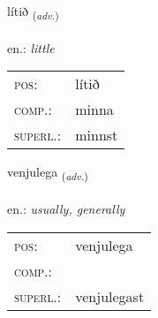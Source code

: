 \documentclass[frontgrid, backgrid]{flacards}\usepackage[]{graphicx}\usepackage[]{xcolor}
\begin{document}
\renewcommand{\flhead}{\vskip5pt \fboxsep=0pt {\small\bfseries\footnotesize Atviksorð | Adverb}}
\renewcommand{\fcfoot}{\vskip5pt \fboxsep=0pt \hspace{2pt}{\small\bfseries\footnotesize 2K}}

\renewcommand{\blhead}{\vskip5pt {\small\bfseries\footnotesize Atviksorð | Adverb }}
\renewcommand{\bcfoot}{\vskip5pt \hspace{2pt}{\small\bfseries\footnotesize 2K}}


{lítið \small{\textsubscript{(\textit{adv.})}} \\[1ex] %
\textphonetic{[liːtɪð]} \\
en.: \emph{little} \\  [2ex]
\renewcommand*{\arraystretch}{0.8}
\begin{tabular}{ll}
\textsc{pos}: & lítið \\ 
\textsc{comp.}: & minna \\ 
\textsc{superl.}: & minnst \\
\end{tabular}
}

\renewcommand{\flhead}{\vskip5pt \fboxsep=0pt {\small\bfseries\footnotesize Atviksorð | Adverb}}
\renewcommand{\fcfoot}{\vskip5pt \fboxsep=0pt \hspace{2pt}{\small\bfseries\footnotesize 2K}}

\renewcommand{\blhead}{\vskip5pt {\small\bfseries\footnotesize Atviksorð | Adverb }}
\renewcommand{\bcfoot}{\vskip5pt \hspace{2pt}{\small\bfseries\footnotesize 2K}}


{venjulega \small{\textsubscript{(\textit{adv.})}} \\[1ex] %
\textphonetic{[vɛnjʏlɛɣa]} \\
en.: \emph{usually, generally} \\  [2ex]
\renewcommand*{\arraystretch}{0.8}
\begin{tabular}{ll}
\textsc{pos}: & venjulega \\ 
\textsc{comp.}: &  \\ 
\textsc{superl.}: & venjulegast \\
\end{tabular}
}
\end{document}
